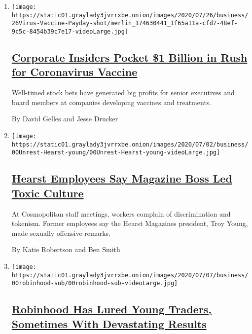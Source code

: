 \begin{enumerate}
\def\labelenumi{\arabic{enumi}.}
\item
  \texttt{[image: https://static01.graylady3jvrrxbe.onion/images/2020/07/26/business/26Virus-Vaccine-Payday-shot/merlin\_174630441\_1f65a11a-cfd7-48ef-9c5c-8454b39c7e17-videoLarge.jpg]}

  \hypertarget{corporate-insiders-pocket-1-billion-in-rush-for-coronavirus-vaccine}{%
  \subsection{\texorpdfstring{\href{/2020/07/25/business/coronavirus-vaccine-profits-vaxart.html}{Corporate
  Insiders Pocket \$1 Billion in Rush for Coronavirus
  Vaccine}}{Corporate Insiders Pocket \$1 Billion in Rush for Coronavirus Vaccine}}\label{corporate-insiders-pocket-1-billion-in-rush-for-coronavirus-vaccine}}

  Well-timed stock bets have generated big profits for senior executives
  and board members at companies developing vaccines and treatments.

  By David Gelles and Jesse Drucker
\item
  \texttt{[image: https://static01.graylady3jvrrxbe.onion/images/2020/07/02/business/00Unrest-Hearst-young/00Unrest-Hearst-young-videoLarge.jpg]}

  \hypertarget{hearst-employees-say-magazine-boss-led-toxic-culture}{%
  \subsection{\texorpdfstring{\href{/2020/07/22/business/media/hearst-harassment-troy-young.html}{Hearst
  Employees Say Magazine Boss Led Toxic
  Culture}}{Hearst Employees Say Magazine Boss Led Toxic Culture}}\label{hearst-employees-say-magazine-boss-led-toxic-culture}}

  At Cosmopolitan staff meetings, workers complain of discrimination and
  tokenism. Former employees say the Hearst Magazines president, Troy
  Young, made sexually offensive remarks.

  By Katie Robertson and Ben Smith
\item
  \texttt{[image: https://static01.graylady3jvrrxbe.onion/images/2020/07/07/business/00robinhood-sub/00robinhood-sub-videoLarge.jpg]}

  \hypertarget{robinhood-has-lured-young-traders-sometimes-with-devastating-results}{%
  \subsection{\texorpdfstring{\href{/2020/07/08/technology/robinhood-risky-trading.html}{Robinhood
  Has Lured Young Traders, Sometimes With Devastating
  Results}}{Robinhood Has Lured Young Traders, Sometimes With Devastating Results}}\label{robinhood-has-lured-young-traders-sometimes-with-devastating-results}}


\end{enumerate}
